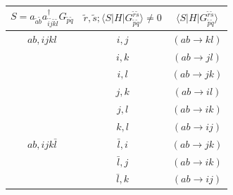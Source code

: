 \begin{table}
\begin{tabular}{ c|c|c }
		\hline \hline
		$S = a_{\tilde a \tilde b} a^\dagger_{\tilde i \tilde j \tilde k \tilde l} G_{\tilde p \tilde q} $ & $\tilde r, \tilde s ;  \langle S|H|G_{\tilde p \tilde q}^{\tilde r \tilde s} \rangle \neq 0$ & $\langle S|H|G_{\tilde p \tilde q}^{\tilde r \tilde s} \rangle$ \\
		\hline \hline
		\rule{0pt}{3ex} $ab,ijkl$                                                                                          & $i,j$                                                                                        & $(ab \rightarrow kl)$                                           \\
		                                                                                                   & $i,k$                                                                                        & $(ab \rightarrow jl)$                                           \\
		                                                                                                   & $i,l$                                                                                        & $(ab \rightarrow jk)$                                           \\
		                                                                                                   & $j,k$                                                                                        & $(ab \rightarrow il)$                                           \\
		                                                                                                   & $j,l$                                                                                        & $(ab \rightarrow ik)$                                           \\
		                                                                                                   & $k,l$                                                                                        & $(ab \rightarrow ij)$                                           \\
		              
		\hline
		\rule{0pt}{3ex} $ab,ijk\bar l$                                                                                     & $\bar l, i$                                                                                  & $(ab \rightarrow jk)$                                           \\
		                                                                                                   & $\bar l, j$                                                                                  & $(ab \rightarrow ik)$                                           \\ 
		                                                                                                   & $\bar l, k$                                                                                  & $(ab \rightarrow ij)$                                           \\ 
		        

\end{tabular}
\end{table}
